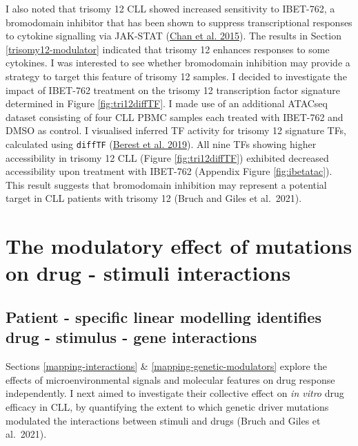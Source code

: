 \documentclass[11pt, a4paper, twosided]{book}
\begin{document}
I also noted that trisomy 12 CLL showed increased sensitivity to IBET-762, a bromodomain inhibitor that has been shown to suppress transcriptional responses to cytokine signalling via JAK-STAT (\protect\hyperlink{ref-Chan2015}{Chan et al. 2015}). The results in Section \ref{trisomy12-modulator} indicated that trisomy 12 enhances responses to some cytokines. I was interested to see whether bromodomain inhibition may provide a strategy to target this feature of trisomy 12 samples. I decided to investigate the impact of IBET-762 treatment on the trisomy 12 transcription factor signature determined in Figure \ref{fig:tri12diffTF}. I made use of an additional ATACseq dataset consisting of four CLL PBMC samples each treated with IBET-762 and DMSO as control. I visualised inferred TF activity for trisomy 12 signature TFs, calculated using \texttt{diffTF} (\protect\hyperlink{ref-Berest2019}{Berest et al. 2019}). All nine TFs showing higher accessibility in trisomy 12 CLL (Figure \ref{fig:tri12diffTF}) exhibited decreased accessibility upon treatment with IBET-762 (Appendix Figure \ref{fig:ibetatac}). This result suggests that bromodomain inhibition may represent a potential target in CLL patients with trisomy 12 (Bruch and Giles et al.~2021).

\hypertarget{drug-stimulus-gene-interactions}{%
\section{The modulatory effect of mutations on drug - stimuli interactions}\label{drug-stimulus-gene-interactions}}

\hypertarget{patient---specific-linear-modelling-identifies-drug---stimulus---gene-interactions}{%
\subsection{Patient - specific linear modelling identifies drug - stimulus - gene interactions}\label{patient---specific-linear-modelling-identifies-drug---stimulus---gene-interactions}}

Sections \ref{mapping-interactions} \& \ref{mapping-genetic-modulators} explore the effects of microenvironmental signals and molecular features on drug response independently. I next aimed to investigate their collective effect on \emph{in vitro} drug efficacy in CLL, by quantifying the extent to which genetic driver mutations modulated the interactions between stimuli and drugs (Bruch and Giles et al.~2021).
\end{document}
